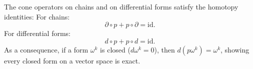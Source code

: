 The cone operators on chains and on differential forms satisfy the homotopy identities:
For chains: $$\partial \circ p + p \circ \partial = \text{id}.$$
For differential forms: $$d \circ p + p \circ d = \text{id}.$$
As a consequence, if a form $\omega^k$ is closed ($d\omega^k = 0$), then $d(p\omega^k) = \omega^k$, showing every closed form on a vector space is exact.
